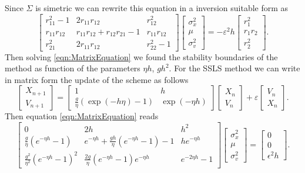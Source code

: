 Since $\Sigma$ is simetric we can rewrite this equation in a inversion suitable form as
\begin{equation}\label{eqn:MatrixEquation}
	\begin{bmatrix}
		r_{11}^2 - 1	&2r_{11}r_{12}						&r_{12}^2		\\
		r_{11}r_{12}	&r_{11}r_{12}+ r_{12}r_{21} - 1		&r_{11}r_{12}	\\
		r_{21}^2		&2r_{11}r_{12}						&r_{22}^2 -1
	\end{bmatrix}
	\begin{bmatrix}
		\sigma_x^2\\
		\mu\\
		\sigma_v^2
	\end{bmatrix}
	= -\varepsilon^2
	h
	\begin{bmatrix}
		r_1^2\\
		r_1 r_2\\
		r_2^2
	\end{bmatrix}.
\end{equation}
Then solving \cref{eqn:MatrixEquation} we found the stability boundaries of the method  as function
of the parameters $\eta h $, $g h^2$.
For the SSLS method we can write in matrix form the update of the scheme as follows
\begin{equation}
	\begin{bmatrix}
		X_{n+1}\\
		V_{n+1}
	\end{bmatrix}
	=
	\begin{bmatrix}
		1											& h\\
		\frac{g}{\eta}\left(\exp(-h\eta) - 1 \right)	
		& \exp(-\eta h)%
	\end{bmatrix}
	\begin{bmatrix}
		X_n\\V_n
	\end{bmatrix}
	+
	\varepsilon
	\begin{bmatrix}
		V_n\\
		X_n
	\end{bmatrix}.
\end{equation}
%
Then equation \eqref{eqn:MatrixEquation} reads
\begin{equation}
	\begin{bmatrix} 
		0	&2h		&{h}^{2}\\ 
		\frac{g}{\eta}
			\left( 
				e^{-\eta h}-1 
			\right)
		&
		e^{-\eta h} 
			+\frac{gh}{\eta}
				\left( 
					e^{-\eta h}-1 
				\right) -1
			&
			h  e^{-\eta h}
			\\ 
		\frac{g^2}{\eta^2} 
			\left( 
				e^{-\eta h}-1
			\right)^2
			&
		\frac{2 g}{\eta}
			\left(
				e^{-\eta h} - 1 
			\right)
			e^{-\eta h}
		& 
		e^{-2\eta h} -1
	\end{bmatrix}
	\begin{bmatrix}
		\sigma_x^2\\
		\mu\\
		\sigma_v^2
	\end{bmatrix}
	=
	\begin{bmatrix}
		0\\
		0\\
		\epsilon^2 h
	\end{bmatrix}.
\end{equation}
